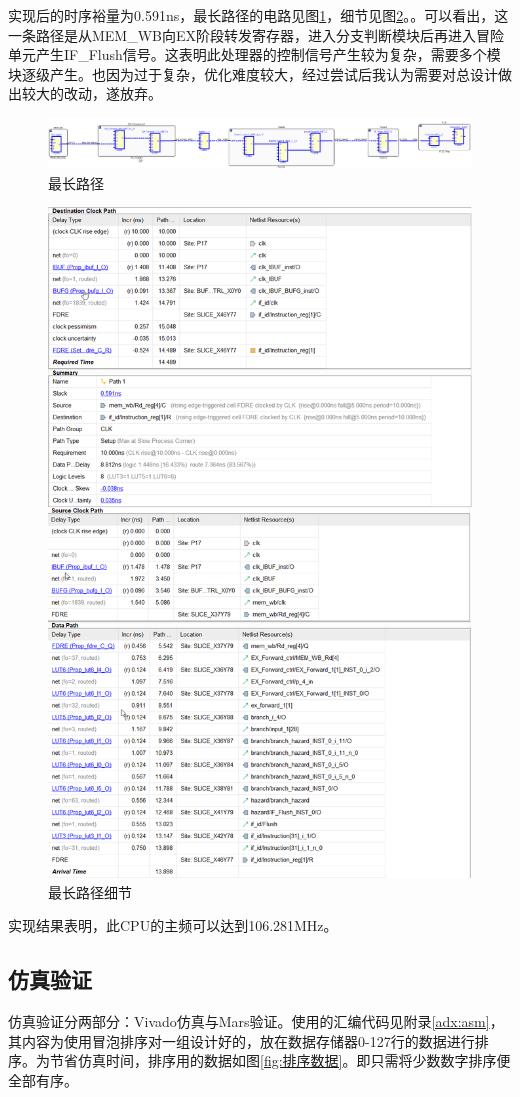 \documentclass[a4paper]{article}
\begin{document}
实现后的时序裕量为0.591ns，最长路径的电路见图\ref{fig:最长路径}，细节见图\ref{fig:最长路径细节}。。可以看出，这一条路径是从MEM\_WB向EX阶段转发寄存器，进入分支判断模块后再进入冒险单元产生IF\_Flush信号。这表明此处理器的控制信号产生较为复杂，需要多个模块逐级产生。也因为过于复杂，优化难度较大，经过尝试后我认为需要对总设计做出较大的改动，遂放弃。

\begin{figure}[H]
    \centering
    \includegraphics[width=.9\textwidth]{../assets/最长路径.png}
    \caption{最长路径}
    \label{fig:最长路径}
\end{figure}

\begin{figure}[H]
    \centering
    \includegraphics[width=.5\textwidth]{../assets/最长路径_细节.png}
    \caption{最长路径细节}
    \label{fig:最长路径细节}
\end{figure}

实现结果表明，此CPU的主频可以达到106.281MHz。

\subsection{仿真验证}

仿真验证分两部分：Vivado仿真与Mars验证。使用的汇编代码见附录\ref{adx:asm}，其内容为使用冒泡排序对一组设计好的，放在数据存储器0-127行的数据进行排序。为节省仿真时间，排序用的数据如图\ref{fig:排序数据}。即只需将少数数字排序便全部有序。
\end{document}
